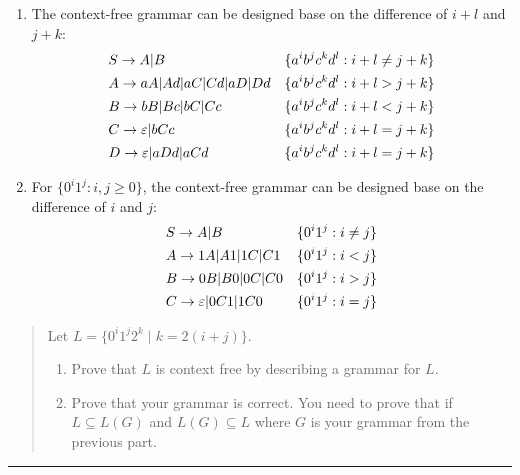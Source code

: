 \documentclass[11pt]{article}
\begin{document}
\begin{solution}
	\begin{enumerate}
		\item The context-free grammar can be designed base on the difference of $i + l$ and $j + k$:
			\begin{align}
				&S \rightarrow A | B & \{a^ib^jc^kd^l : i + l \neq j + k\} \nonumber\\
				&A \rightarrow aA | Ad | aC | Cd | aD | Dd & \{a^ib^jc^kd^l : i + l > j + k\} \nonumber\\
				&B \rightarrow bB | Bc | bC | Cc & \{a^ib^jc^kd^l : i + l < j + k\} \nonumber\\
				&C \rightarrow \varepsilon | bCc & \{a^ib^jc^kd^l : i + l = j + k\}   \nonumber\\
				&D \rightarrow \varepsilon | aDd | aCd & \{a^ib^jc^kd^l : i + l = j + k\} \nonumber
			\end{align}
		\item For $\{0^i1^j: i, j \geq 0\}$, the context-free grammar can be designed base on the difference of $i$ and $j$:
			\begin{align}
				&S \rightarrow A | B & \{0^i1^j: i \neq j\} \nonumber\\
				&A \rightarrow 1A | A1 | 1C | C1 & \{0^i1^j: i < j\}\nonumber\\
				&B \rightarrow 0B | B0 | 0C | C0 & \{0^i1^j: i > j\}\nonumber\\
				&C \rightarrow \varepsilon | 0C1 | 1C0 & \{0^i1^j: i = j\} \nonumber
			\end{align}
	\end{enumerate}
\end{solution}


\begin{quote}
Let $L = \{0^i1^j2^k \mid k = 2(i+j)\}$.
  \begin{enumerate}
  \item Prove that $L$ is context free by describing a grammar for $L$.
  \item Prove that your grammar is correct. You need to prove
    that if $L \subseteq L(G)$ and $L(G) \subseteq L$ where $G$ is your
    grammar from the previous part.
  \end{enumerate}
\end{quote}
\hrule

\begin{solution}

	
\end{solution}
\end{document}
